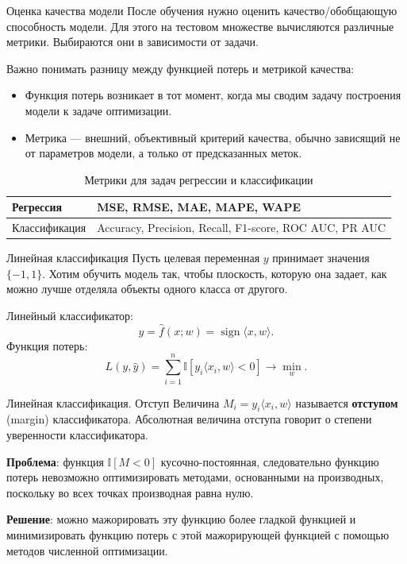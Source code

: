 \documentclass[notheorems, handout]{beamer}
\begin{document}
\begin{frame}{Оценка качества модели}
  После обучения нужно оценить качество/обобщающую способность
  модели. Для этого на тестовом множестве вычисляются различные
  метрики. Выбираются они в зависимости от задачи.\smallskip

  Важно понимать разницу между функцией потерь и метрикой качества:
  \begin{itemize}
    \item Функция потерь возникает в тот момент, когда мы сводим
      задачу построения модели к задаче оптимизации.
    \item Метрика — внешний, объективный критерий качества, обычно
      зависящий не от параметров модели, а только от предсказанных меток.
  \end{itemize}
  \begin{table}[h!]
    \centering
    \caption{Метрики для задач регрессии и классификации}
    \begin{tabular}{|p{3cm}|p{6cm}|}
      \hline
      Регрессия & MSE, RMSE, MAE, MAPE, WAPE \\
      \hline
      Классификация & Accuracy, Precision, Recall, F1-score, ROC AUC, PR AUC \\
      \hline
    \end{tabular}
  \end{table}\medskip
\end{frame}

\begin{frame}{Линейная классификация}
  Пусть целевая переменная $y$ принимает значения $\{-1, 1\}$. Хотим
  обучить модель так, чтобы плоскость, которую она задает, как можно
  лучше отделяла объекты одного класса от другого.\medskip

  Линейный классификатор:
  \[
    \hat y = \hat f(x; w) = \operatorname{sign} \langle x, w\rangle.
  \]
  Функция потерь:
  \[
    L(y, \hat{y}) = \sum_{i=1}^{n}\mathbb{I}[y_i \langle x_i,
    w\rangle < 0] \longrightarrow \min_{w}.
  \]
\end{frame}

\begin{frame}{Линейная классификация. Отступ}
  Величина $M_i=y_i \langle x_i, w\rangle$ называется
  \textbf{отступом} (margin) классификатора. Абсолютная величина
  отступа говорит о степени уверенности классификатора.\medskip

  \textbf{Проблема}: функция $\mathbb{I}[M < 0]$ кусочно-постоянная,
  следовательно функцию потерь невозможно оптимизировать методами,
  основанными на производных, поскольку во всех точках производная
  равна нулю.\medskip

  \textbf{Решение}: можно мажорировать эту функцию более гладкой
  функцией и минимизировать функцию потерь с этой мажорирующей
  функцией с помощью методов численной оптимизации.
\end{frame}
\end{document}
